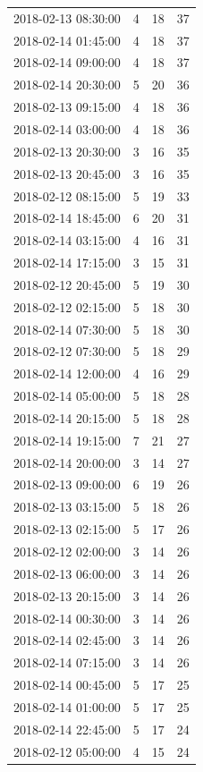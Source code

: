 \begin{tabular}{lrrr}
2018-02-13 08:30:00 & 4 & 18 & 37 \\
2018-02-14 01:45:00 & 4 & 18 & 37 \\
2018-02-14 09:00:00 & 4 & 18 & 37 \\
2018-02-14 20:30:00 & 5 & 20 & 36 \\
2018-02-13 09:15:00 & 4 & 18 & 36 \\
2018-02-14 03:00:00 & 4 & 18 & 36 \\
2018-02-13 20:30:00 & 3 & 16 & 35 \\
2018-02-13 20:45:00 & 3 & 16 & 35 \\
2018-02-12 08:15:00 & 5 & 19 & 33 \\
2018-02-14 18:45:00 & 6 & 20 & 31 \\
2018-02-14 03:15:00 & 4 & 16 & 31 \\
2018-02-14 17:15:00 & 3 & 15 & 31 \\
2018-02-12 20:45:00 & 5 & 19 & 30 \\
2018-02-12 02:15:00 & 5 & 18 & 30 \\
2018-02-14 07:30:00 & 5 & 18 & 30 \\
2018-02-12 07:30:00 & 5 & 18 & 29 \\
2018-02-14 12:00:00 & 4 & 16 & 29 \\
2018-02-14 05:00:00 & 5 & 18 & 28 \\
2018-02-14 20:15:00 & 5 & 18 & 28 \\
2018-02-14 19:15:00 & 7 & 21 & 27 \\
2018-02-14 20:00:00 & 3 & 14 & 27 \\
2018-02-13 09:00:00 & 6 & 19 & 26 \\
2018-02-13 03:15:00 & 5 & 18 & 26 \\
2018-02-13 02:15:00 & 5 & 17 & 26 \\
2018-02-12 02:00:00 & 3 & 14 & 26 \\
2018-02-13 06:00:00 & 3 & 14 & 26 \\
2018-02-13 20:15:00 & 3 & 14 & 26 \\
2018-02-14 00:30:00 & 3 & 14 & 26 \\
2018-02-14 02:45:00 & 3 & 14 & 26 \\
2018-02-14 07:15:00 & 3 & 14 & 26 \\
2018-02-14 00:45:00 & 5 & 17 & 25 \\
2018-02-14 01:00:00 & 5 & 17 & 25 \\
2018-02-14 22:45:00 & 5 & 17 & 24 \\
2018-02-12 05:00:00 & 4 & 15 & 24 \\

\end{tabular}
